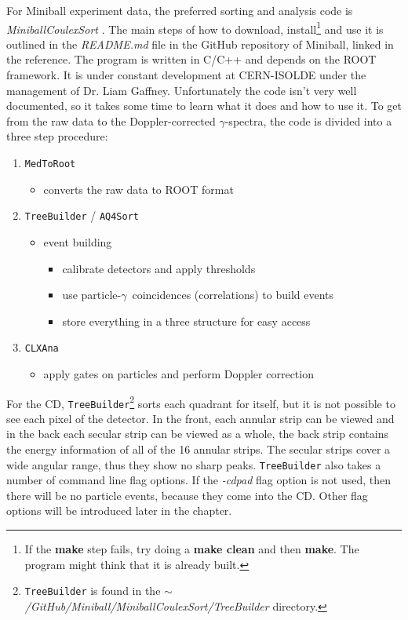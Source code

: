 \documentclass[twoside,english]{uiofysmaster/uiofysmaster}
\newcommand{\ga}{$\gamma$}
\begin{document}
For Miniball experiment data, the preferred sorting and analysis code is \textsl{MiniballCoulexSort} \cite{MBCS}. 
The main steps of how to download, install\footnote{If the \textbf{make} step fails, try doing a \textbf{make clean} and then \textbf{make}. The program might think that it is already built.} and use it is outlined in the \textit{README.md} file in the GitHub repository of Miniball, linked in the reference. 
The program is written in C/C++ and depends on the ROOT framework. 
It is under constant development at CERN-ISOLDE under the management of Dr. Liam Gaffney. 
Unfortunately the code isn't very well documented, so it takes some time to learn what it does and how to use it. 
To get from the raw data to the Doppler-corrected \ga-spectra, the code is divided into a three step procedure:

\begin{enumerate}
	\item \texttt{MedToRoot}
	\begin{itemize}
		\item converts the raw data to ROOT format
	\end{itemize}
	\item \texttt{TreeBuilder} / \texttt{AQ4Sort}
	\begin{itemize}
		\item event building
		\begin{itemize}
			\item calibrate detectors and apply thresholds
			\item use particle-\ga\ coincidences (correlations) to build events
			\item store everything in a three structure for easy access
		\end{itemize}
	\end{itemize}
	\item \texttt{CLXAna}
	\begin{itemize}
		\item apply gates on particles and perform Doppler correction
	\end{itemize}
\end{enumerate}

For the CD, \texttt{TreeBuilder}\footnote{\texttt{TreeBuilder} is found in the \textit{$\sim$/GitHub/Miniball/MiniballCoulexSort/TreeBuilder} directory.} sorts each quadrant for itself, but it is not possible to see each pixel of the detector. 
In the front, each annular strip can be viewed and in the back each secular strip can be viewed as a whole, the back strip contains the energy information of all of the 16 annular strips. 
The secular strips cover a wide angular range, thus they show no sharp peaks.
\texttt{TreeBuilder} also takes a number of command line flag options. 
If the \textit{-cdpad} flag option is not used, then there will be no particle events, because they come into the CD. 
Other flag options will be introduced later in the chapter.
\end{document}
